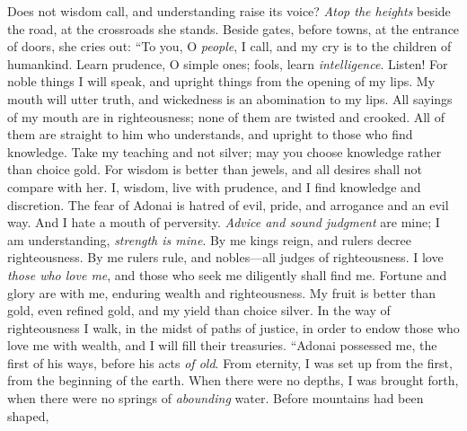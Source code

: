 \begin{biblechapter} %
 Does not wisdom call, 
and understanding raise its voice?
\verse \textit{Atop the heights} beside the road, 
at the crossroads she stands.
\verse Beside gates, before towns, 
at the entrance of doors, she cries out:
\verse “To you, O \textit{people}, I call, 
and my cry is to the children of humankind.
\verse Learn prudence, O simple ones; 
fools, learn \textit{intelligence}.
\verse Listen! For noble things I will speak, 
and upright things from the opening of my lips.
\verse My mouth will utter truth, 
and wickedness is an abomination to my lips.
\verse All sayings of my mouth are in righteousness; 
none of them are twisted and crooked.
\verse All of them are straight to him who understands, 
and upright to those who find knowledge.
\verse Take my teaching and not silver; 
may you choose knowledge rather than choice gold.
\verse For wisdom is better than jewels, 
and all desires shall not compare with her.
\verse I, wisdom, live with prudence, 
and I find knowledge and discretion.
\verse The fear of Adonai is hatred of evil, 
pride, and arrogance and an evil way. 
And I hate a mouth of perversity.
\verse \textit{Advice and sound judgment} are mine; 
I am understanding, \textit{strength is mine}.
\verse By me kings reign, 
and rulers decree righteousness.
\verse By me rulers rule, 
and nobles—all judges of righteousness.
\verse I love \textit{those who love me}, 
and those who seek me diligently shall find me.
\verse Fortune and glory are with me, 
enduring wealth and righteousness.
\verse My fruit is better than gold, even refined gold, 
and my yield than choice silver.
\verse In the way of righteousness I walk, 
in the midst of paths of justice,
\verse in order to endow those who love me with wealth, 
and I will fill their treasuries.
 “Adonai possessed me, the first of his ways, 
before his acts \textit{of old}.
\verse From eternity, I was set up from the first, 
from the beginning of the earth.
\verse When there were no depths, I was brought forth, 
when there were no springs of \textit{abounding} water.
\verse Before mountains had been shaped, 

\end{biblechapter}

